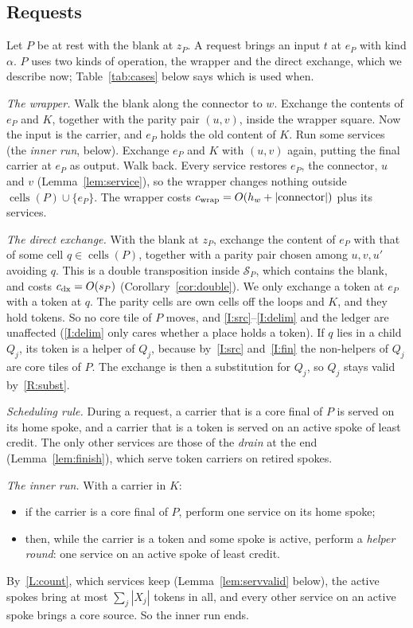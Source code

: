 \documentclass[11pt]{amsart}
\theoremstyle{definition}
\newcommand{\cells}{\operatorname{cells}}
\begin{document}
\subsection{Requests}\label{sec:requests}

Let $P$ be at rest with the blank at $z_P$. A request brings an input $t$ at $e_P$ with kind $\alpha$.
$P$ uses two kinds of operation, the wrapper and the direct exchange, which we describe now; Table~\ref{tab:cases} below says which
is used when.

\emph{The wrapper.} Walk the blank along the connector to $w$. Exchange the contents of $e_P$ and $K$,
together with the parity pair $(u,v)$, inside the wrapper square. Now the input is the carrier, and
$e_P$ holds the old content of $K$. Run some services (the \emph{inner run}, below). Exchange $e_P$ and $K$
with $(u,v)$ again, putting the final carrier at $e_P$ as output. Walk back. Every service restores $e_P$, the connector,
$u$ and $v$ (Lemma~\ref{lem:service}), so the wrapper changes nothing outside $\cells(P)\cup\{e_P\}$. The
wrapper costs $c_{\rm wrap}=O(h_w+|\text{connector}|)$ plus its services.

\emph{The direct exchange.} With the blank at $z_P$, exchange the content of $e_P$ with that of some cell $q\in\cells(P)$,
together with a parity pair chosen among $u,v,u'$ avoiding $q$. This is a double transposition inside
$\mathcal S_P$, which contains the blank, and costs $c_{\rm dx}=O(s_P)$ (Corollary~\ref{cor:double}). We only exchange a token at $e_P$
with a token at $q$. The parity cells are own cells off the loops and $K$, and they hold tokens. So no core tile of $P$ moves,
and \ref{I:src}--\ref{I:delim} and the ledger are unaffected (\ref{I:delim} only cares whether a place holds a token). If $q$ lies in a
child $Q_j$, its token is a helper of $Q_j$, because by~\ref{I:src} and~\ref{I:fin} the non-helpers of $Q_j$ are core tiles of $P$.
The exchange is then a substitution for $Q_j$, so $Q_j$ stays valid by~\ref{R:subst}.

\emph{Scheduling rule.} During a request, a carrier that is a core final of $P$ is served on its home spoke, and a carrier
that is a token is served on an active spoke of least credit. The only other services are those of the \emph{drain} at the end
(Lemma~\ref{lem:finish}), which serve token carriers on retired spokes.

\emph{The inner run.} With a carrier in $K$:
\begin{itemize}[nosep]
\item if the carrier is a core final of $P$, perform one service on its home spoke;
\item then, while the carrier is a token and some spoke is active, perform a \emph{helper round}:
  one service on an active spoke of least credit.
\end{itemize}
By~\ref{L:count}, which services keep (Lemma~\ref{lem:servvalid} below), the active spokes bring at most $\sum_j|X_j|$ tokens in
all, and every other service on an active spoke brings a core source. So the inner run ends.
\end{document}
